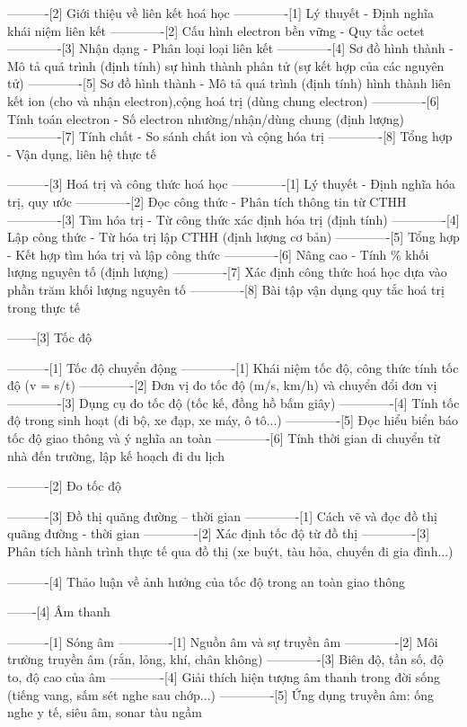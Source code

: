 ----------[2] Giới thiệu về liên kết hoá học
-------------[1] Lý thuyết - Định nghĩa khái niệm liên kết
-------------[2] Cấu hình electron bền vững - Quy tắc octet
-------------[3] Nhận dạng - Phân loại loại liên kết
-------------[4] Sơ đồ hình thành - Mô tả quá trình (định tính) sự hình thành phân tử (sự kết hợp của các nguyên tử)
-------------[5] Sơ đồ hình thành - Mô tả quá trình (định tính) hình thành liên kết ion (cho và nhận electron),cộng hoá trị (dùng chung electron)
-------------[6] Tính toán electron - Số electron nhường/nhận/dùng chung (định lượng)
-------------[7] Tính chất - So sánh chất ion và cộng hóa trị
-------------[8] Tổng hợp - Vận dụng, liên hệ thực tế

----------[3] Hoá trị và công thức hoá học
-------------[1] Lý thuyết - Định nghĩa hóa trị, quy ước
-------------[2] Đọc công thức - Phân tích thông tin từ CTHH
-------------[3] Tìm hóa trị - Từ công thức xác định hóa trị (định tính)
-------------[4] Lập công thức - Từ hóa trị lập CTHH (định lượng cơ bản)
-------------[5] Tổng hợp - Kết hợp tìm hóa trị và lập công thức
-------------[6] Nâng cao - Tính \% khối lượng nguyên tố (định lượng)
-------------[7] Xác định công thức hoá học dựa vào phần trăm khối lượng nguyên tố
-------------[8] Bài tập vận dụng quy tắc hoá trị trong thực tế

-------[3] Tốc độ

----------[1] Tốc độ chuyển động
-------------[1] Khái niệm tốc độ, công thức tính tốc độ (v = s/t)
-------------[2] Đơn vị đo tốc độ (m/s, km/h) và chuyển đổi đơn vị
-------------[3] Dụng cụ đo tốc độ (tốc kế, đồng hồ bấm giây)
-------------[4] Tính tốc độ trong sinh hoạt (đi bộ, xe đạp, xe máy, ô tô...)
-------------[5] Đọc hiểu biển báo tốc độ giao thông và ý nghĩa an toàn
-------------[6] Tính thời gian di chuyển từ nhà đến trường, lập kế hoạch đi du lịch

----------[2] Đo tốc độ

----------[3] Đồ thị quãng đường – thời gian
-------------[1] Cách vẽ và đọc đồ thị quãng đường - thời gian
-------------[2] Xác định tốc độ từ đồ thị
-------------[3] Phân tích hành trình thực tế qua đồ thị (xe buýt, tàu hỏa, chuyến đi gia đình...)

----------[4] Thảo luận về ảnh hưởng của tốc độ trong an toàn giao thông

-------[4] Âm thanh

----------[1] Sóng âm
-------------[1] Nguồn âm và sự truyền âm
-------------[2] Môi trường truyền âm (rắn, lỏng, khí, chân không)
-------------[3] Biên độ, tần số, độ to, độ cao của âm
-------------[4] Giải thích hiện tượng âm thanh trong đời sống (tiếng vang, sấm sét nghe sau chớp...)
-------------[5] Ứng dụng truyền âm: ống nghe y tế, siêu âm, sonar tàu ngầm

